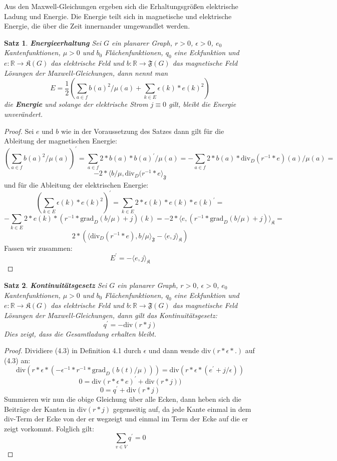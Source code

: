 \documentclass[11pt,a4paper,leqno]{report}
\newtheorem{proposition}{Satz}[chapter]
\numberwithin{equation}{chapter}
\begin{document}
\noindent
Aus den Maxwell-Gleichungen ergeben sich die Erhaltungsgr\"o\ss{}en elektrische Ladung und Energie. Die Energie teilt sich in magnetische und elektrische Energie, die \"uber die Zeit innernander umgewandlet werden.
\begin{proposition}\textbf{Energieerhaltung}
	Sei $G$ ein planarer Graph, $r>0$, $\epsilon>0$, $e_0$ Kantenfunktionen, $\mu>0$ und $b_0$ Fl\"achenfunktionen, $q_0$ eine Eckfunktion und  $e:\mathbb{R}\rightarrow\mathfrak{K}(G)$ das elektrische Feld und $b:\mathbb{R}\rightarrow\mathfrak{F}(G)$ das magnetische Feld L\"osungen der Maxwell-Gleichungen, dann nennt man 
	\begin{equation}
	E = \frac{1}{2}(\sum_{a\in f} b(a)^2 /\mu(a) + \sum_{k\in E} \epsilon(k) * e(k)^2)
	\end{equation}
	die \textbf{Energie} und solange der elektrische Strom $j\equiv 0$ gilt, bleibt die Energie unver\"andert. 
\end{proposition}
\begin{proof}
	Sei $e$ und $b$ wie in der Voraussetzung des Satzes dann gilt f\"ur die Ableitung der magnetischen Energie:
	$$(\sum_{a\in f} b(a)^2 /\mu(a))^\prime = \sum_{a\in f} 2 * b(a) * b(a)^\prime /\mu(a) = -\sum_{a\in f} 2 * b(a) * \text{div}_D(r^{-1} * e)(a) /\mu(a)=$$
	$$-2 * \langle b /\mu, \text{div}_D(r^{-1} * e\rangle_{\mathfrak{F}}$$
	und f\"ur die Ableitung der elektrischen Energie:
	$$(\sum_{k\in E} \epsilon(k) * e(k)^2)^\prime = \sum_{k\in E} 2 * \epsilon(k) * e(k) * e(k)^\prime = $$
	$$-\sum_{k\in E} 2 * e(k) * (r^{-1} * \text{grad}_D(b /\mu) + j) (k)=-2 * \langle e, (r^{-1} * \text{grad}_D(b /\mu) + j) \rangle_{\mathfrak{K}}=$$
	$$2 * (\langle \text{div}_D(r^{-1} * e), b /\mu\rangle_{\mathfrak{F}} - \langle e, j\rangle_{\mathfrak{K}})$$
	Fassen wir zusammen:
	$$E^\prime = -\langle e, j\rangle_{\mathfrak{K}}$$
\end{proof}
\begin{proposition}\textbf{Kontinuit\"atsgesetz}
	Sei $G$ ein planarer Graph, $r>0$, $\epsilon>0$, $e_0$ Kantenfunktionen, $\mu>0$ und $b_0$ Fl\"achenfunktionen, $q_0$ eine Eckfunktion und  $e:\mathbb{R}\rightarrow\mathfrak{K}(G)$ das elektrische Feld und $b:\mathbb{R}\rightarrow\mathfrak{F}(G)$ das magnetische Feld L\"osungen der Maxwell-Gleichungen, dann gilt das Kontinuit\"atsgesetz:
	$$q^\prime = - \text{div}(r*j)$$
	Dies zeigt, dass die Gesamtladung erhalten bleibt.
\end{proposition}
\begin{proof}
	
	Dividiere (4.3) in Definition 4.1 durch $\epsilon$ und dann wende $\text{div}(r * \epsilon * .)$ auf (4.3) an:
	$$\text{div}(r * \epsilon * (-\epsilon^{-1} * r^{-1} * \text{grad}_D(b(t) / \mu))) = \text{div}(r * \epsilon * (e^\prime + j/\epsilon))$$
	$$0 = \text{div}(r * \epsilon * e)^\prime + \text{div}(r * j))$$
	$$0 = q^\prime + \text{div}(r * j)$$
	Summieren wir nun die obige Gleichung \"uber alle Ecken, dann heben sich die Beitr\"age der Kanten in $\text{div}(r*j)$ gegenseitig auf, da jede Kante einmal in dem $\text{div}$-Term der Ecke von der er wegzeigt und einmal im Term der Ecke auf die er zeigt vorkommt. Folglich gilt:
	$$\sum_{v\in V}q^\prime=0$$
\end{proof}
\end{document}

